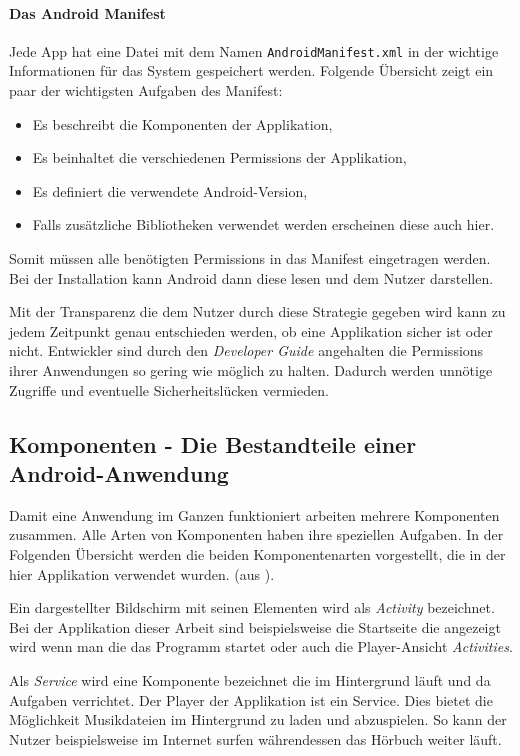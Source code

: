\paragraph{Das Android Manifest}
Jede App hat eine Datei mit dem Namen \verb+AndroidManifest.xml+ in der wichtige Informationen für das System gespeichert werden. Folgende Übersicht zeigt ein paar der wichtigsten Aufgaben des Manifest:

\begin{itemize}
	\item Es beschreibt die Komponenten der Applikation,
	\item Es beinhaltet die verschiedenen Permissions der Applikation,
	\item Es definiert die verwendete Android-Version,
	\item Falls zusätzliche Bibliotheken verwendet werden erscheinen diese auch hier.
\end{itemize}

Somit müssen alle benötigten Permissions in das Manifest eingetragen werden. Bei der Installation kann Android dann diese lesen und dem Nutzer darstellen.

Mit der Transparenz die dem Nutzer durch diese Strategie gegeben wird kann zu jedem Zeitpunkt genau entschieden werden, ob eine Applikation sicher ist oder nicht. Entwickler sind durch den \emph{Developer Guide} \cite{android_api} angehalten die Permissions ihrer Anwendungen so gering wie möglich zu halten. Dadurch werden unnötige Zugriffe und eventuelle Sicherheitslücken vermieden.

\subsection{Komponenten - Die Bestandteile einer Android-Anwendung}
Damit eine Anwendung im Ganzen funktioniert arbeiten mehrere Komponenten zusammen. Alle Arten von Komponenten haben ihre speziellen Aufgaben. In der Folgenden Übersicht werden die beiden Komponentenarten vorgestellt, die in der hier Applikation verwendet wurden. (aus \cite{android_components}).

\begin{description}[style=nextline]
	\item[Activities] Ein dargestellter Bildschirm mit seinen Elementen wird als \emph{Activity} bezeichnet. Bei der Applikation dieser Arbeit sind beispielsweise die Startseite die angezeigt wird wenn man die das Programm startet oder auch die Player-Ansicht \emph{Activities}.
	\item[Services] Als \emph{Service} wird eine Komponente bezeichnet die im Hintergrund läuft und da Aufgaben verrichtet. Der Player der Applikation ist ein Service. Dies bietet die Möglichkeit Musikdateien im Hintergrund zu laden und abzuspielen. So kann der Nutzer beispielsweise im Internet surfen währendessen das Hörbuch weiter läuft.
\end{description}

